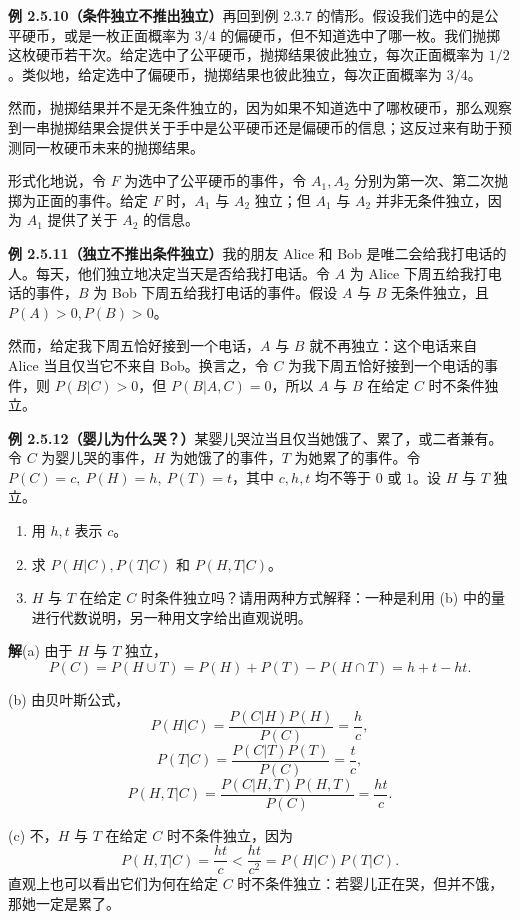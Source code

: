 \documentclass[UTF8, 12pt, fontset=fandol, oneside]{ctexart}
\begin{document}
\noindent\textbf{例 2.5.10（条件独立不推出独立）}\quad 再回到例 2.3.7 的情形。假设我们选中的是公平硬币，或是一枚正面概率为 $3/4$ 的偏硬币，但不知道选中了哪一枚。我们抛掷这枚硬币若干次。给定选中了公平硬币，抛掷结果彼此独立，每次正面概率为 $1/2$。类似地，给定选中了偏硬币，抛掷结果也彼此独立，每次正面概率为 $3/4$。

然而，抛掷结果并不是无条件独立的，因为如果不知道选中了哪枚硬币，那么观察到一串抛掷结果会提供关于手中是公平硬币还是偏硬币的信息；这反过来有助于预测同一枚硬币未来的抛掷结果。

形式化地说，令 $F$ 为选中了公平硬币的事件，令 $A_1,A_2$ 分别为第一次、第二次抛掷为正面的事件。给定 $F$ 时，$A_1$ 与 $A_2$ 独立；但 $A_1$ 与 $A_2$ 并非无条件独立，因为 $A_1$ 提供了关于 $A_2$ 的信息。

\noindent\textbf{例 2.5.11（独立不推出条件独立）}\quad 我的朋友 Alice 和 Bob 是唯二会给我打电话的人。每天，他们独立地决定当天是否给我打电话。令 $A$ 为 Alice 下周五给我打电话的事件，$B$ 为 Bob 下周五给我打电话的事件。假设 $A$ 与 $B$ 无条件独立，且 $P(A)>0,P(B)>0$。

然而，给定我下周五恰好接到一个电话，$A$ 与 $B$ 就不再独立：这个电话来自 Alice 当且仅当它不来自 Bob。换言之，令 $C$ 为我下周五恰好接到一个电话的事件，则 $P(B|C)>0$，但 $P(B|A,C)=0$，所以 $A$ 与 $B$ 在给定 $C$ 时不条件独立。

\noindent\textbf{例 2.5.12（婴儿为什么哭？）}\quad 某婴儿哭泣当且仅当她饿了、累了，或二者兼有。令 $C$ 为婴儿哭的事件，$H$ 为她饿了的事件，$T$ 为她累了的事件。令 $P(C)=c,\ P(H)=h,\ P(T)=t$，其中 $c,h,t$ 均不等于 $0$ 或 $1$。设 $H$ 与 $T$ 独立。

\begin{enumerate}
  \item[(a)] 用 $h,t$ 表示 $c$。
  \item[(b)] 求 $P(H|C),P(T|C)$ 和 $P(H,T|C)$。
  \item[(c)] $H$ 与 $T$ 在给定 $C$ 时条件独立吗？请用两种方式解释：一种是利用 (b) 中的量进行代数说明，另一种用文字给出直观说明。
\end{enumerate}

\noindent\textbf{解}\quad (a) 由于 $H$ 与 $T$ 独立，
\[
  P(C)=P(H\cup T)=P(H)+P(T)-P(H\cap T)=h+t-ht.
\]

(b) 由贝叶斯公式，
\[
  P(H|C)=\frac{P(C|H)P(H)}{P(C)}=\frac{h}{c},
\]
\[
  P(T|C)=\frac{P(C|T)P(T)}{P(C)}=\frac{t}{c},
\]
\[
  P(H,T|C)=\frac{P(C|H,T)P(H,T)}{P(C)}=\frac{ht}{c}.
\]

(c) 不，$H$ 与 $T$ 在给定 $C$ 时不条件独立，因为
\[
  P(H,T|C)=\frac{ht}{c}<\frac{ht}{c^2}=P(H|C)P(T|C).
\]
直观上也可以看出它们为何在给定 $C$ 时不条件独立：若婴儿正在哭，但并不饿，那她一定是累了。
\end{document}
